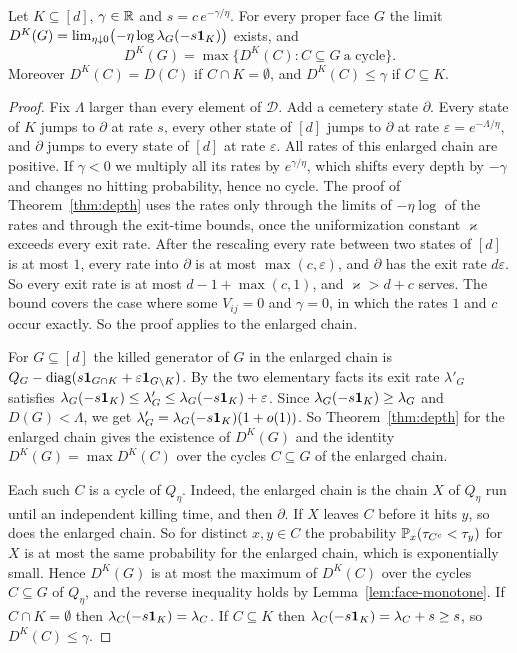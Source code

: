 \fi

\begin{lemma}\label{lem:killed-depth}
Let $K\subseteq[d]$, $\gamma\in\mathbb{R}$ and $s=c\,e^{-\gamma/\eta}$. For every proper
face $G$ the limit
$D^K(G)=\lim_{\eta\downarrow0}\bigl(-\eta\log\lambda_G(-s\mathbf{1}_K)\bigr)$ exists, and
\[
 D^K(G)=\max\{D^K(C):C\subseteq G\ \text{a cycle}\}.
\]
Moreover $D^K(C)=D(C)$ if $C\cap K=\emptyset$, and $D^K(C)\le\gamma$ if
$C\subseteq K$.
\end{lemma}

\begin{proof}
Fix $\Lambda$ larger than every element of $\mathcal D$. Add a cemetery state
$\partial$. Every state of $K$ jumps to $\partial$ at rate $s$, every other state
of $[d]$ jumps to $\partial$ at rate $\varepsilon=e^{-\Lambda/\eta}$, and $\partial$
jumps to every state of $[d]$ at rate $\varepsilon$. All rates of this enlarged
chain are positive. If $\gamma<0$ we multiply all its rates by $e^{\gamma/\eta}$,
which shifts every depth by $-\gamma$ and changes no hitting probability, hence
no cycle. The proof of Theorem~\ref{thm:depth} uses the rates only through the
limits of $-\eta\log$ of the rates and through the exit-time bounds, once the
uniformization constant $\varkappa$ exceeds every exit rate. After the rescaling every
rate between two states of $[d]$ is at most $1$, every rate into $\partial$ is at most
$\max(c,\varepsilon)$, and $\partial$ has the exit rate $d\varepsilon$. So every exit rate is
at most $d-1+\max(c,1)$, and $\varkappa>d+c$ serves. The bound covers the case where some
$V_{ij}=0$ and $\gamma=0$, in which the rates $1$ and $c$ occur exactly. So the proof applies
to the enlarged chain.

For $G\subseteq[d]$ the killed generator of $G$ in the enlarged chain is
$Q_G-\operatorname{diag}(s\mathbf{1}_{G\cap K}+\varepsilon\mathbf{1}_{G\setminus K})$. By the two
elementary facts its exit rate $\lambda'_G$ satisfies
$\lambda_G(-s\mathbf{1}_K)\le\lambda'_G\le\lambda_G(-s\mathbf{1}_K)+\varepsilon$. Since
$\lambda_G(-s\mathbf{1}_K)\ge\lambda_G$ and $D(G)<\Lambda$, we get
$\lambda'_G=\lambda_G(-s\mathbf{1}_K)(1+o(1))$. So Theorem~\ref{thm:depth} for the
enlarged chain gives the existence of $D^K(G)$ and the identity
$D^K(G)=\max D^K(C)$ over the cycles $C\subseteq G$ of the enlarged chain.

Each such $C$ is a cycle of $Q_\eta$. Indeed, the enlarged chain is the chain
$X$ of $Q_\eta$ run until an independent killing time, and then $\partial$. If $X$
leaves $C$ before it hits $y$, so does the enlarged chain. So for distinct
$x,y\in C$ the probability $\mathbb{P}_x(\tau_{C^c}<\tau_y)$ for $X$ is at most the
same probability for the enlarged chain, which is exponentially small. Hence
$D^K(G)$ is at most the maximum of $D^K(C)$ over the cycles $C\subseteq G$ of
$Q_\eta$, and the reverse inequality holds by Lemma~\ref{lem:face-monotone}. If
$C\cap K=\emptyset$ then $\lambda_C(-s\mathbf{1}_K)=\lambda_C$. If $C\subseteq K$ then
$\lambda_C(-s\mathbf{1}_K)=\lambda_C+s\ge s$, so $D^K(C)\le\gamma$.
\end{proof}

